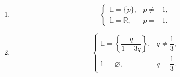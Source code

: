 \begin{enumerate}
    \item
          \[
              \begin{cases}
                  \mathbb{L}=\{p\},      & p\neq-1, \\
                  \mathbb{L}=\mathbb{R}, & p=-1.
              \end{cases}
          \]

    \item
          \[
              \begin{cases}
                  \mathbb{L}=\left\{\dfrac{q}{1-3q}\right\}, & q\neq\dfrac13, \\[1ex]
                  \mathbb{L}=\varnothing,                    & q=\dfrac13.
              \end{cases}
          \]
\end{enumerate}